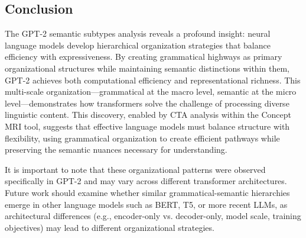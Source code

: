 \subsection{Conclusion}

The GPT-2 semantic subtypes analysis reveals a profound insight: neural language models develop hierarchical organization strategies that balance efficiency with expressiveness. By creating grammatical highways as primary organizational structures while maintaining semantic distinctions within them, GPT-2 achieves both computational efficiency and representational richness. This multi-scale organization—grammatical at the macro level, semantic at the micro level—demonstrates how transformers solve the challenge of processing diverse linguistic content. This discovery, enabled by CTA analysis within the Concept MRI tool, suggests that effective language models must balance structure with flexibility, using grammatical organization to create efficient pathways while preserving the semantic nuances necessary for understanding.

It is important to note that these organizational patterns were observed specifically in GPT-2 and may vary across different transformer architectures. Future work should examine whether similar grammatical-semantic hierarchies emerge in other language models such as BERT, T5, or more recent LLMs, as architectural differences (e.g., encoder-only vs. decoder-only, model scale, training objectives) may lead to different organizational strategies.